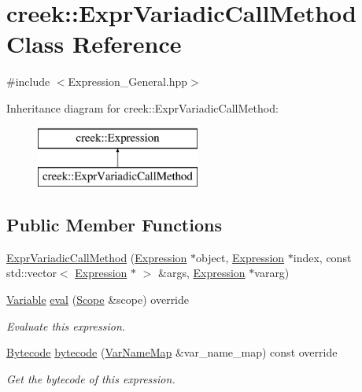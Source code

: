 \hypertarget{classcreek_1_1_expr_variadic_call_method}{}\section{creek\+:\+:Expr\+Variadic\+Call\+Method Class Reference}
\label{classcreek_1_1_expr_variadic_call_method}


{\ttfamily \#include $<$Expression\+\_\+\+General.\+hpp$>$}

Inheritance diagram for creek\+:\+:Expr\+Variadic\+Call\+Method\+:\begin{figure}[H]
\begin{center}
\leavevmode
\includegraphics[height=2.000000cm]{classcreek_1_1_expr_variadic_call_method}
\end{center}
\end{figure}
\subsection*{Public Member Functions}
\begin{DoxyCompactItemize}
\item 
\hyperlink{classcreek_1_1_expr_variadic_call_method_a59ae20cfabca173d24128ec169e368c8}{Expr\+Variadic\+Call\+Method} (\hyperlink{classcreek_1_1_expression}{Expression} $\ast$object, \hyperlink{classcreek_1_1_expression}{Expression} $\ast$index, const std\+::vector$<$ \hyperlink{classcreek_1_1_expression}{Expression} $\ast$ $>$ \&args, \hyperlink{classcreek_1_1_expression}{Expression} $\ast$vararg)
\item 
\hyperlink{classcreek_1_1_variable}{Variable} \hyperlink{classcreek_1_1_expr_variadic_call_method_a19efdd6a56fd70f685b18ce4684c9113}{eval} (\hyperlink{classcreek_1_1_scope}{Scope} \&scope) override
\begin{DoxyCompactList}\small\item\em Evaluate this expression. \end{DoxyCompactList}\item 
\hyperlink{classcreek_1_1_bytecode}{Bytecode} \hyperlink{classcreek_1_1_expr_variadic_call_method_a640c36f23100563640b850156e44d264}{bytecode} (\hyperlink{classcreek_1_1_var_name_map}{Var\+Name\+Map} \&var\+\_\+name\+\_\+map) const  override\hypertarget{classcreek_1_1_expr_variadic_call_method_a640c36f23100563640b850156e44d264}{}\label{classcreek_1_1_expr_variadic_call_method_a640c36f23100563640b850156e44d264}

\begin{DoxyCompactList}\small\item\em Get the bytecode of this expression. \end{DoxyCompactList}\end{DoxyCompactItemize}


